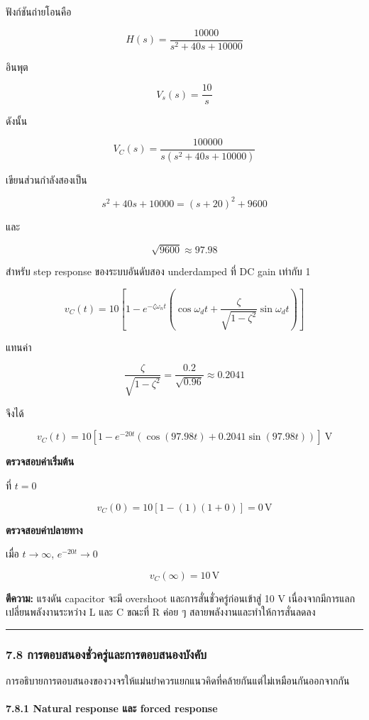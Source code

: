 ฟังก์ชันถ่ายโอนคือ

\[
H(s)=\frac{10000}{s^2+40s+10000}
\]

อินพุต

\[
V_s(s)=\frac{10}{s}
\]

ดังนั้น

\[
V_C(s)=\frac{100000}{s(s^2+40s+10000)}
\]

เขียนส่วนกำลังสองเป็น

\[
s^2+40s+10000=(s+20)^2+9600
\]

และ

\[
\sqrt{9600}\approx97.98
\]

สำหรับ step response ของระบบอันดับสอง underdamped ที่ DC gain เท่ากับ 1

\[
v_C(t)=10\left[1-e^{-\zeta\omega_nt}\left(\cos\omega_dt+\frac{\zeta}{\sqrt{1-\zeta^2}}\sin\omega_dt\right)\right]
\]

แทนค่า

\[
\frac{\zeta}{\sqrt{1-\zeta^2}}=\frac{0.2}{\sqrt{0.96}}\approx0.2041
\]

จึงได้

\[
\boxed{v_C(t)=10\left[1-e^{-20t}\left(\cos(97.98t)+0.2041\sin(97.98t)\right)\right]\ \text{V}}
\]

\textbf{ตรวจสอบค่าเริ่มต้น}

ที่ $t=0$

\[
v_C(0)=10[1-(1)(1+0)]=0\,\text{V}
\]

\textbf{ตรวจสอบค่าปลายทาง}

เมื่อ $t\to\infty$, $e^{-20t}\to0$

\[
v_C(\infty)=10\,\text{V}
\]

\textbf{ตีความ:} แรงดัน capacitor จะมี overshoot และการสั่นชั่วครู่ก่อนเข้าสู่ 10 V เนื่องจากมีการแลกเปลี่ยนพลังงานระหว่าง L และ C ขณะที่ R ค่อย ๆ สลายพลังงานและทำให้การสั่นลดลง

\par\noindent\rule{\textwidth}{0.4pt}\par

\subsubsection{7.8 การตอบสนองชั่วครู่และการตอบสนองบังคับ}

การอธิบายการตอบสนองของวงจรให้แม่นยำควรแยกแนวคิดที่คล้ายกันแต่ไม่เหมือนกันออกจากกัน

\paragraph{7.8.1 Natural response และ forced response}

